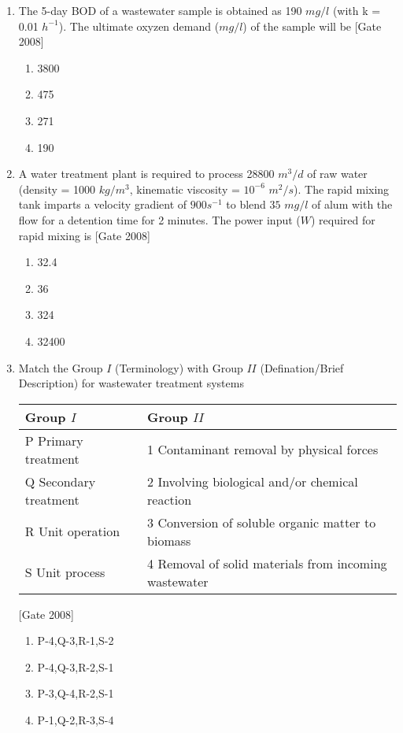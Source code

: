 \documentclass[journal]{IEEEtran}
\begin{document}
\begin{enumerate}
\begin{multicols}{2}
\begin{enumerate}
	\end{enumerate}
\end{multicols}
	\item The 5-day BOD of a wastewater sample is obtained as 190 $mg/l$ (with k = 0.01 $h^{-1}$). The ultimate oxyzen demand ($mg/l$) of the sample will be  \hfill [Gate 2008]
	\begin{multicols}{4}
	\begin{enumerate}
		\item 3800
		\item 475
		\item 271
		\item 190
	\end{enumerate}
\end{multicols}
\item A water treatment plant is required to process 28800 $m^3/d$ of raw water (density = 1000 $kg/m^3$, kinematic viscosity = $10^{-6}$ $m^2/s$). The rapid mixing tank imparts a velocity gradient of $900 s^{-1}$ to blend  $35$ $mg/l$ of alum with the flow for a detention time for 2 minutes. The power input ($W$) required for rapid mixing is  \hfill [Gate 2008]
\begin{multicols}{4}
	\begin{enumerate}
		\item 32.4
		\item 36
		\item 324
		\item 32400
	\end{enumerate}
\end{multicols}
	\item Match the Group $I$ (Terminology) with Group $II$ (Defination/Brief Description) for wastewater treatment systems   
\begin{center}

\begin{tabular}{|l|l|}
	\hline 
	Group $I$ & Group $II$\\
	\hline
	P Primary treatment   & 1 Contaminant removal by physical forces \\
	\hline
	Q Secondary treatment & 2 Involving biological and/or chemical reaction\\
	\hline
	R Unit operation & 3 Conversion of soluble organic matter to biomass \\
	\hline
	S Unit process & 4 Removal of solid materials from incoming wastewater\\
	\hline

\end{tabular}
\end{center}
 \hfill [Gate 2008]
\begin{multicols}{2}
	\begin{enumerate}
		\item P-4,Q-3,R-1,S-2
		\item P-4,Q-3,R-2,S-1
		\item P-3,Q-4,R-2,S-1
		\item P-1,Q-2,R-3,S-4
	\end{enumerate}
\end{multicols}



\end{enumerate}
\end{document}

